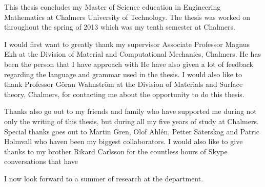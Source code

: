 \documentclass[preface.tex]{subfiles}
\begin{document}
This thesis concludes my Master of Science education in Engineering Mathematics at Chalmers University of Technology. The thesis was worked on throughout the spring of 2013 which was my tenth semester at Chalmers.

I would first want to greatly thank my supervisor Associate Professor Magnus Ekh at the Division of Material and Computational Mechanics, Chalmers. He has been the person that I have approach with  He have also given a lot of feedback regarding the language and grammar used in the thesis.
I would also like to thank Professor Göran Wahnström at the Division of Materials and Surface theory, Chalmers,  for contacting me about the opportunity to do this thesis. 

Thanks also go out to my friends and family who have supported me during not only the writing of this thesis, but during all my five years of study at Chalmers. Special thanks goes out to Martin Gren, Olof Ahlén, Petter Säterskog and Patric Holmvall who haven been my biggest collaborators. I would also like to give thanks to my brother Rikard Carlsson for the countless hours of Skype conversations that have

I now look forward to a summer of research at the department.
\end{document}
